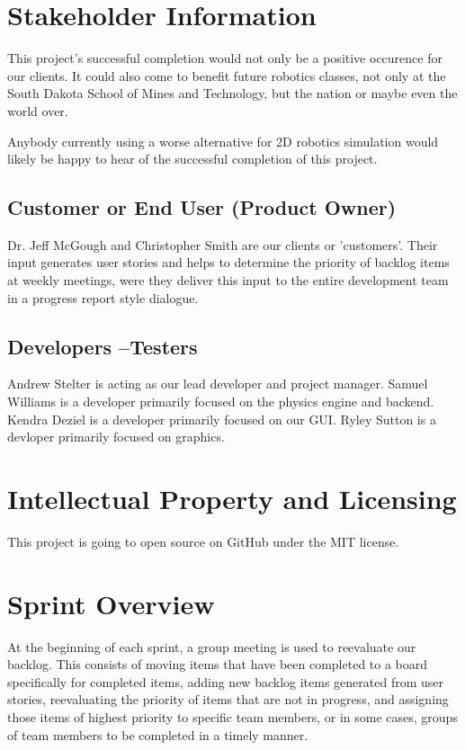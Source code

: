 \section{ Stakeholder Information}
This project's successful completion would not only be a positive occurence for our clients. It could also come to benefit future robotics classes, not only at the South Dakota School of Mines and Technology, but the nation or maybe even the world over.

Anybody currently using a worse alternative for 2D robotics simulation would likely be happy to hear of the successful completion of this project.

\subsection{Customer or End User (Product Owner)}
Dr. Jeff McGough and Christopher Smith are our clients or 'customers'. Their input generates user stories and helps to determine the priority of backlog items at weekly meetings, were they deliver this input to the entire development team in a progress report style dialogue.

\subsection{Developers --Testers}
Andrew Stelter is acting as our lead developer and project manager. Samuel Williams is a developer primarily focused on the physics engine and backend. Kendra Deziel is a developer primarily focused on our GUI. Ryley Sutton is a devloper primarily focused on graphics.

\section{Intellectual Property and Licensing}
This project is going to open source on GitHub under the MIT license. 

\section{Sprint  Overview}
At the beginning of each sprint, a group meeting is used to reevaluate our backlog. This consists of moving items that have been completed to a board specifically for completed items, adding new backlog items generated from user stories, reevaluating the priority of items that are not in progress, and assigning those items of highest priority to specific team members, or in some cases, groups of team members to be completed in a timely manner.

